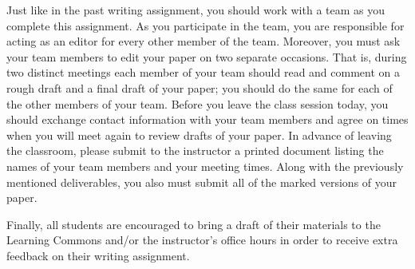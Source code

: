 Just like in the past writing assignment, you should work with a team as you complete this assignment.  As you
participate in the team, you are responsible for acting as an editor for every other member of the team.  Moreover, you
must ask your team members to edit your paper on two separate occasions.  That is, during two distinct meetings each
member of your team should read and comment on a rough draft and a final draft of your paper; you should do the same for
each of the other members of your team. Before you leave the class session today, you should exchange contact
information with your team members and agree on times when you will meet again to review drafts of your paper.  In
advance of leaving the classroom, please submit to the instructor a printed document listing the names of your team
members and your meeting times. Along with the previously mentioned deliverables, you also must
submit all of the marked versions of your paper.

Finally, all students are encouraged to bring a draft of their materials to the
Learning Commons and/or the instructor's office hours in order to receive extra feedback on their writing assignment.


